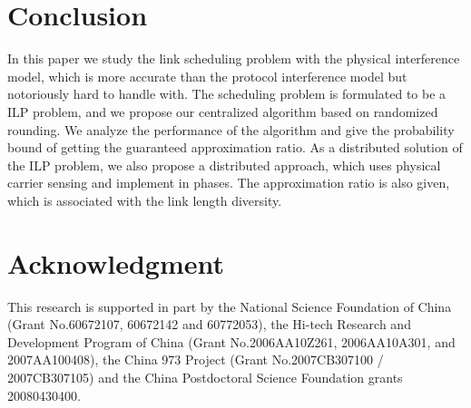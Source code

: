 \documentclass[conference]{IEEEtran}
\begin{document}
\section{Conclusion}\label{section7}
In this paper we study the link scheduling problem with the physical
interference model, which is more accurate than the protocol
interference model but notoriously hard to handle with. The
scheduling problem is formulated to be a ILP problem, and we propose
our centralized algorithm based on randomized rounding. We analyze
the performance of the algorithm and give the probability bound of
getting the guaranteed approximation ratio. As a distributed
solution of the ILP problem, we also propose a distributed approach,
which uses physical carrier sensing and implement in phases. The
approximation ratio is also given, which is associated with the link
length diversity.
\renewcommand{\baselinestretch}{1}
\selectfont
\section*{Acknowledgment}
This research is supported in part by the National Science
Foundation of China (Grant No.60672107, 60672142 and 60772053), the
Hi-tech Research and Development Program of China (Grant
No.2006AA10Z261, 2006AA10A301, and 2007AA100408), the China 973
Project (Grant No.2007CB307100 / 2007CB307105) and the China
Postdoctoral Science Foundation grants 20080430400.

\end{document}
